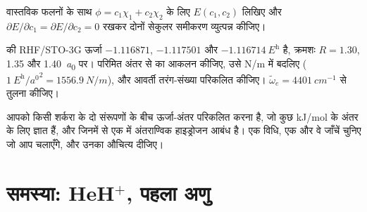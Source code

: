 \begin{exercise}[$\star\star\star$]\label{exo:b3:computational-chemistry:10}
वास्तविक फलनों के साथ $\phi = c_1\chi_1 + c_2\chi_2$ के लिए $E(c_1,c_2)$ लिखिए और
$\partial E/\partial c_1 =
\partial E/\partial c_2 = 0$ रखकर दोनों सेकुलर समीकरण व्युत्पन्न कीजिए।
\end{exercise}

\begin{exercise}[$\star\star\star$]\label{exo:b3:computational-chemistry:11}
 की RHF/STO-3G ऊर्जा $-1.116871$, $-1.117501$ और
$\qty{-1.116714}{\hartree}$ है, क्रमशः $R = 1.30$, 1.35 और \qty{1.40}{\bohr} पर। परिमित
अंतर से  का आकलन कीजिए, उसे \unit{N/m} में बदलिए
($\qty{1}{\hartree\per\bohr\squared} = \qty{1556.9}{N/m}$), और आवर्ती
तरंग-संख्या परिकलित कीजिए। $\tilde\omega_e = \qty{4401}{cm^{-1}}$ से तुलना कीजिए।
\end{exercise}

\begin{exercise}[$\star\star\star$]\label{exo:b3:computational-chemistry:12}
आपको किसी शर्करा के दो संरूपणों के बीच ऊर्जा-अंतर परिकलित करना है,
जो कुछ \unit{kJ/mol} के अंतर के लिए ज्ञात हैं, और जिनमें से एक में अंतराण्विक हाइड्रोजन आबंध
है। एक विधि, एक  और वे जाँचें चुनिए जो आप
चलाएँगे, और उनका औचित्य दीजिए।
\end{exercise}

\section{समस्या: HeH\texorpdfstring{$^+$}{+}, पहला अणु}

